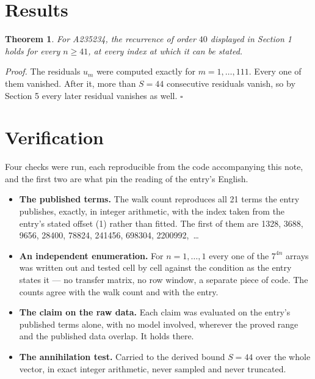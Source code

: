 \documentclass[11pt]{article}
\newtheorem{theorem}{Theorem}
\theoremstyle{definition}
\begin{document}
\section{Results}

\begin{theorem} For A235234, the recurrence of order $40$ displayed in Section 1 holds for every $n \ge 41$, at every index at which it can be stated.\end{theorem}

{\itshape Proof.} The residuals $u_m$ were computed exactly for $m = 1,\dots,111$. Every one of them vanished. After it, more than $S = 44$ consecutive residuals vanish, so by Section 5 every later residual vanishes as well. $\square$

\section{Verification}

Four checks were run, each reproducible from the code accompanying this note, and the first two are what pin the reading of the entry's English.

\begin{itemize}

\item {\bfseries The published terms.} The walk count reproduces all 21 terms the entry publishes, exactly, in integer arithmetic, with the index taken from the entry's stated offset (1) rather than fitted. The first of them are 1328, 3688, 9656, 28400, 78824, 241456, 698304, 2200992,~\dots

\item {\bfseries An independent enumeration.} For $n = 1,\dots,1$ every one of the $7^{4n}$ arrays was written out and tested cell by cell against the condition as the entry states it --- no transfer matrix, no row window, a separate piece of code. The counts agree with the walk count and with the entry.

\item {\bfseries The claim on the raw data.} Each claim was evaluated on the entry's published terms alone, with no model involved, wherever the proved range and the published data overlap. It holds there.

\item {\bfseries The annihilation test.} Carried to the derived bound $S = 44$ over the whole vector, in exact integer arithmetic, never sampled and never truncated.

\end{itemize}
\end{document}
